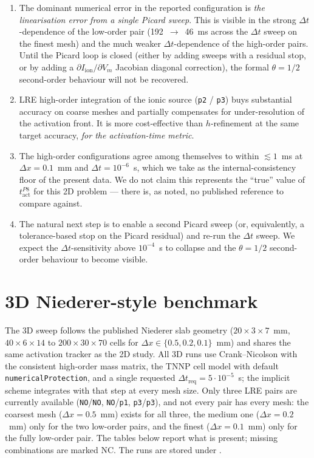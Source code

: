 \documentclass[11pt,a4paper]{article}
\newcommand{\Vm}{V_{m}}
\newcommand{\Iion}{I_{\text{ion}}}
\newcommand{\code}[1]{\texttt{\small #1}}
\begin{document}
\begin{enumerate}[leftmargin=*]
\item The dominant numerical error in the reported configuration is
\emph{the linearisation error from a single Picard sweep}. This is
visible in the strong $\Delta t$-dependence of the low-order pair
(192~$\rightarrow$~46~ms across the $\Delta t$ sweep on the finest
mesh) and the much weaker $\Delta t$-dependence of the high-order
pairs. Until the Picard loop is closed (either by adding sweeps with
a residual stop, or by adding a $\partial\Iion/\partial\Vm$ Jacobian
diagonal correction), the formal $\theta = 1/2$ second-order behaviour
will not be recovered.
\item LRE high-order integration of the ionic source (\code{p2} /
\code{p3}) buys substantial accuracy on coarse meshes and partially
compensates for under-resolution of the activation front. It is more
cost-effective than $h$-refinement at the same target accuracy,
\emph{for the activation-time metric}.
\item The high-order configurations agree among themselves to within
$\lesssim 1$~ms at $\Delta x = 0.1$~mm and $\Delta t = 10^{-6}$~s,
which we take as the internal-consistency floor of the present data.
We do not claim this represents the ``true'' value of
$t_{\text{act}}^{P8}$ for this 2D problem --- there is, as noted,
no published reference to compare against.
\item The natural next step is to enable a second Picard sweep
(or, equivalently, a tolerance-based stop on the Picard residual) and
re-run the $\Delta t$ sweep. We expect the $\Delta t$-sensitivity
above $10^{-4}$~s to collapse and the $\theta = 1/2$ second-order
behaviour to become visible.
\end{enumerate}

\section{3D Niederer-style benchmark}
\label{sec:results:3D}

The 3D sweep follows the published Niederer
slab geometry ($20\times 3\times 7$~mm, $40\times 6\times 14$ to
$200\times 30\times 70$ cells for $\Delta x\in\{0.5,0.2,0.1\}$~mm) and
shares the same activation tracker as the 2D study. All 3D runs use
Crank--Nicolson with the consistent high-order mass matrix, the
TNNP cell model with default \code{numericalProtection}, and a single
requested $\Delta t_{\text{req}} = 5\!\cdot\!10^{-5}$~s; the implicit
scheme integrates with that step at every mesh size. Only three LRE
pairs are currently available (\code{NO}/\code{NO}, \code{NO}/\code{p1},
\code{p3}/\code{p3}), and not every pair has every mesh: the coarsest
mesh ($\Delta x = 0.5$~mm) exists for all three, the medium one
($\Delta x = 0.2$~mm) only for the two low-order pairs, and the finest
($\Delta x = 0.1$~mm) only for the fully low-order pair. The tables
below report what is present; missing combinations are marked
\textsc{NC}. The runs are stored under
.
\end{document}
